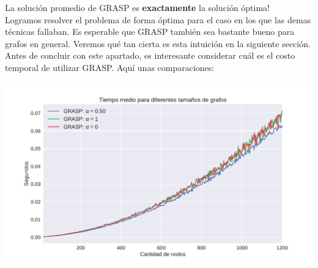 La solución promedio de GRASP es \textbf{exactamente} la solución óptima! \\

Logramos resolver el problema de forma óptima para el caso en los que las demas técnicas fallaban. Es esperable que GRASP también sea bastante bueno para grafos en general. Veremos qué tan cierta es esta intuición en la siguiente sección. \\

Antes de concluir con este apartado, es interesante considerar cuál es el costo temporal de utilizar GRASP. Aquí unas comparaciones:

{\centering
    \includegraphics[width=1\textwidth]{informe/imgs/exp_malo_tiempo_grasp.pdf}
}
